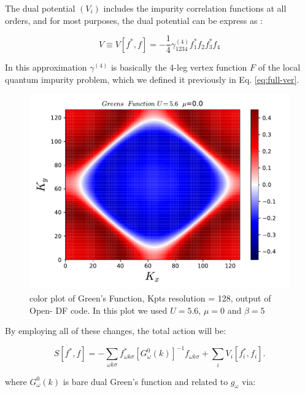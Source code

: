 The dual potential $(V_i)$ includes the impurity correlation functions at all orders, and for most purposes, the dual potential can be express as \cite{Lechermann}:

\begin{equation}
    V \equiv V[f ^*, f]= - \frac{1}{4} \gamma _{1234} ^{(4)} f_1 ^* f_2 f_3 ^* f_4
\end{equation}

In this approximation $\gamma ^{(4)}$ is basically the 4-leg vertex function $F$ of the local quantum impurity problem, which we defined it previously in Eq. \ref{eq:full-ver}.



\begin{figure}[ht]
\centering
    \includegraphics[width=1.1\linewidth]{fig2/green.pdf}
    
\caption{ color plot of Green's Function, Kpts resolution = 128, output of Open- DF code. In this plot we used $U=5.6$, $\mu= 0$ and $\beta=5$ \label{fig:Greens function}}
\end{figure} 




By employing all of these changes, the total action will be:

\begin{equation}
    S[f^* , f]= -\sum _{\omega k \sigma} f_{\omega k \sigma} ^* [G_\omega ^0 (k)]^{-1} f_{\omega k \sigma} + \sum _i V_i [f_i ^*, f_i].
\end{equation}

where $G_\omega ^0 (k)$ is bare dual Green's function and related to $g_{\omega}$ via:

